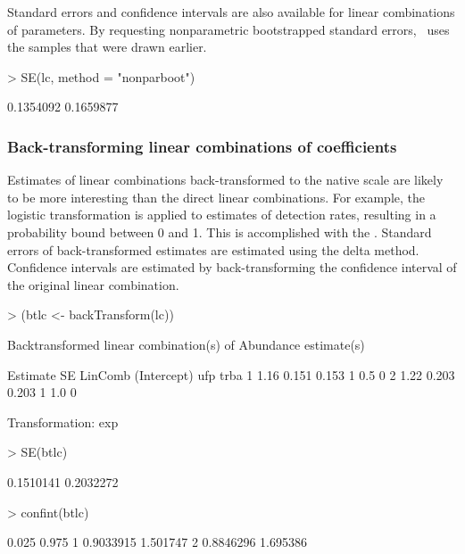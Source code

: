 \documentclass[article,shortnames]{jss}
\newcommand{\um}{\pkg{unmarked}}
\begin{document}
{Standard errors and confidence intervals are also available for linear
combinations of parameters.  By requesting nonparametric bootstrapped
standard errors, \um\ uses the samples that were drawn earlier.

\begin{Schunk}
\begin{Sinput}
> SE(lc, method = "nonparboot")
\end{Sinput}
\begin{Soutput}
[1] 0.1354092 0.1659877
\end{Soutput}
\end{Schunk}

\subsubsection{Back-transforming linear combinations of coefficients}

Estimates of linear combinations back-transformed to the native scale
are likely to be more interesting than the direct linear combinations.
For example, the logistic transformation is applied to estimates of
detection rates, resulting in a probability bound between 0 and
1. This is accomplished with the .  Standard
errors of back-transformed estimates are estimated using the delta
method.  Confidence intervals are estimated by back-transforming the
confidence interval of the original linear combination.

\begin{Schunk}
\begin{Sinput}
> (btlc <- backTransform(lc))
\end{Sinput}
\begin{Soutput}
Backtransformed linear combination(s) of Abundance estimate(s)

  Estimate    SE LinComb (Intercept) ufp trba
1     1.16 0.151   0.153           1 0.5    0
2     1.22 0.203   0.203           1 1.0    0

Transformation: exp 
\end{Soutput}
\begin{Sinput}
> SE(btlc)
\end{Sinput}
\begin{Soutput}
[1] 0.1510141 0.2032272
\end{Soutput}
\begin{Sinput}
> confint(btlc)
\end{Sinput}
\begin{Soutput}
      0.025    0.975
1 0.9033915 1.501747
2 0.8846296 1.695386
\end{Soutput}
\end{Schunk}

}
\end{document}
